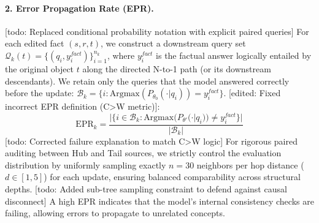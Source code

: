 \paragraph{2. Error Propagation Rate (EPR).}
[todo: Replaced conditional probability notation with explicit paired queries] For each edited fact $(s,r,t)$, we construct a downstream query set $\mathcal{Q}_k(t)=\{(q_i, y_i^{fact})\}_{i=1}^{n_k}$, where $y_i^{fact}$ is the factual answer logically entailed by the original object $t$ along the directed N-to-1 path (or its downstream descendants).
We retain only the queries that the model answered correctly before the update: $\mathcal{B}_k=\{i: \text{Argmax}(P_{\theta_0}(\cdot | q_i))=y_i^{fact}\}$. [edited: Fixed incorrect EPR definition (C>W metric)]:
\begin{equation}
    \text{EPR}_k = \frac{|\{i\in \mathcal{B}_k: \text{Argmax}(P_{\theta'}(\cdot | q_i))\not= y_i^{fact}\}|}{|\mathcal{B}_k|}
\end{equation}
[todo: Corrected failure explanation to match C>W logic]
For rigorous paired auditing between Hub and Tail sources, we strictly control the evaluation distribution by uniformly sampling exactly $n=30$ neighbors per hop distance ($d \in [1, 5]$) for each update, ensuring balanced comparability across structural depths. [todo: Added sub-tree sampling constraint to defend against causal disconnect] A high EPR indicates that the model's internal consistency checks are failing, allowing errors to propagate to unrelated concepts.

